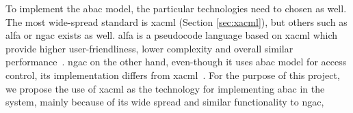 To implement the \acrshort{abac} model, the particular technologies need to chosen as well. The most wide-spread standard is \acrshort{xacml} (Section \ref{sec:xacml}), but others such as \acrfull{alfa} or \acrfull{ngac} exists as well. \acrshort{alfa} is a pseudocode language based on \acrshort{xacml} which provide higher user-friendliness, lower complexity and overall similar performance~\cite{Mejri2016FormalPolicies}. \acrshort{ngac} on the other hand, even-though it uses \acrshort{abac} model for access control, its implementation differs from \acrshort{xacml}~\cite{Ferraiolo2016ANGAC}. For the purpose of this project, we propose the use of \acrshort{xacml} as the technology for implementing \acrshort{abac} in the system, mainly because of its wide spread and similar functionality to \acrshort{ngac},

